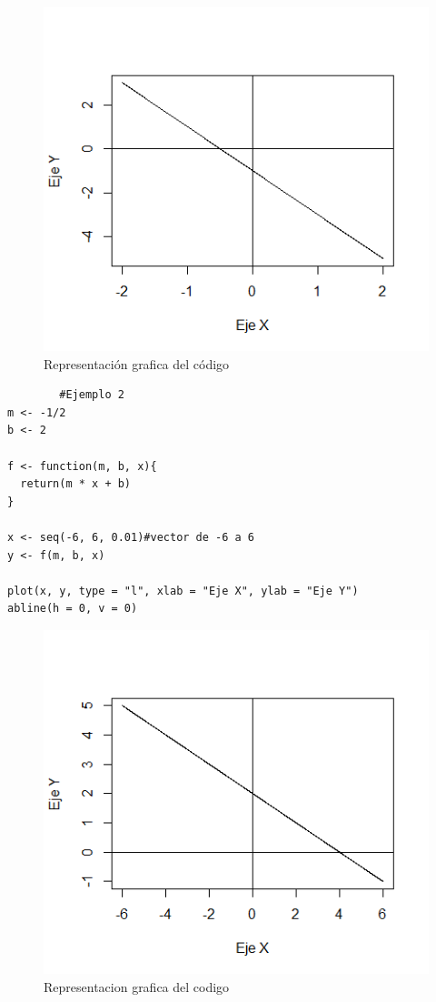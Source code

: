 \documentclass[12pt,a4paper]{article} %
\begin{document}
\begin{figure}
\centering
\includegraphics[scale=1]{Recta1}
\caption{Representación grafica del código}
\label{fig:LineaRecta}
\end{figure}

\begin{table}[htpb]
	\begin{lstlisting}
		#Ejemplo 2
m <- -1/2 
b <- 2 

f <- function(m, b, x){
  return(m * x + b)
}

x <- seq(-6, 6, 0.01)#vector de -6 a 6
y <- f(m, b, x) 

plot(x, y, type = "l", xlab = "Eje X", ylab = "Eje Y") 
abline(h = 0, v = 0)
	\end{lstlisting}
	\caption{Segundo código en R para gráficar la recta de la figura \ref{fig:LineaRecta2}.}
\label{alg:LineaRecta2}	
\end{table}


\begin{figure}
\centering
\includegraphics[scale=1]{Recta2}
\caption{Representacion grafica del codigo }
\label{fig:LineaRecta2}
\end{figure}
\end{document}
